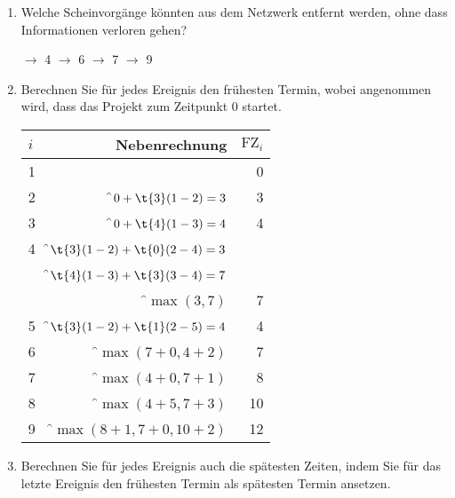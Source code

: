 \documentclass{lehramt-informatik-aufgabe}
\begin{document}
\begin{enumerate}

%

\item Welche Scheinvorgänge könnten aus dem Netzwerk entfernt werden,
ohne dass Informationen verloren gehen?

\begin{itemize}
 $\rightarrow$ 4
 $\rightarrow$ 6
 $\rightarrow$ 7
 $\rightarrow$ 9
\end{itemize}

%

\item Berechnen Sie für jedes Ereignis den frühesten Termin, wobei
angenommen wird, dass das Projekt zum Zeitpunkt 0 startet.

\begin{liAntwort}
\begin{center}
\begin{tabular}{|l|r|r|}
\hline
$i$ & Nebenrechnung & $\text{FZ}_i$\\
\hline\hline
1             &                                                & 0 \\\hline
2             & \f$0 + \t{3}(1-2) = 3$                         & 3 \\\hline
3             & \f$0 + \t{4}(1-3) = 4$                 & 4 \\\hline
4             & \f$\t{3}(1-2) + \t{0}(2-4) = 3$                & \\
              & \f$\t{4}(1-3) + \t{3}(3-4) = 7$                & \\
              & \f$\max(3,7)$                                  & 7 \\\hline
5             & \f$\t{3}(1-2) + \t{1}(2-5) = 4$                 & 4 \\\hline
6             & \f$\max(7 + 0, 4 + 2)$  & 7 \\\hline
7             & \f$\max(4 + 0, 7 + 1)$  & 8 \\\hline
8             & \f$\max(4 + 5, 7 + 3)$  & 10 \\\hline
9             & \f$\max(8 + 1, 7 + 0, 10 + 2)$  & 12 \\\hline
\end{tabular}
\end{center}
\end{liAntwort}

%

\item Berechnen Sie für jedes Ereignis auch die spätesten Zeiten, indem
Sie für das letzte Ereignis den frühesten Termin als spätesten Termin
ansetzen.


\end{enumerate}
\end{document}
